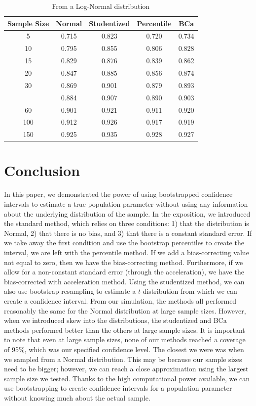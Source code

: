 \documentclass[12pt]{article}
\begin{document}
\begin{table}

\caption{\label{tab:create graphs}From a Log-Normal distribution}
\centering
\begin{tabular}[t]{ccccc}
\toprule
Sample Size & Normal & Studentized & Percentile & BCa\\
\midrule
5 & 0.715 & 0.823 & 0.720 & 0.734\\
10 & 0.795 & 0.855 & 0.806 & 0.828\\
15 & 0.829 & 0.876 & 0.839 & 0.862\\
20 & 0.847 & 0.885 & 0.856 & 0.874\\
30 & 0.869 & 0.901 & 0.879 & 0.893\\
\addlinespace
40 & 0.884 & 0.907 & 0.890 & 0.903\\
60 & 0.901 & 0.921 & 0.911 & 0.920\\
100 & 0.912 & 0.926 & 0.917 & 0.919\\
150 & 0.925 & 0.935 & 0.928 & 0.927\\
\bottomrule
\end{tabular}
\end{table}
\newpage

\hypertarget{conclusion}{%
\section{Conclusion}\label{conclusion}}

In this paper, we demonstrated the power of using bootstrapped
confidence intervals to estimate a true population parameter without
using any information about the underlying distribution of the sample.
In the exposition, we introduced the standard method, which relies on
three conditions: 1) that the distribution is Normal, 2) that there is
no bias, and 3) that there is a constant standard error. If we take away
the first condition and use the bootstrap percentiles to create the
interval, we are left with the percentile method. If we add a
bias-correcting value not equal to zero, then we have the
bias-correcting method. Furthermore, if we allow for a non-constant
standard error (through the acceleration), we have the bias-corrected
with acceleration method. Using the studentized method, we can also use
bootstrap resampling to estimate a \(t\)-distribution from which we can
create a confidence interval. From our simulation, the methods all
performed reasonably the same for the Normal distribution at large
sample sizes. However, when we introduced skew into the distributions,
the studentized and BCa methods performed better than the others at
large sample sizes. It is important to note that even at large sample
sizes, none of our methods reached a coverage of 95\%, which was our
specified confidence level. The closest we were was when we sampled from
a Normal distribution. This may be because our sample sizes need to be
bigger; however, we can reach a close approximation using the largest
sample size we tested. Thanks to the high computational power available,
we can use bootstrapping to create confidence intervals for a population
parameter without knowing much about the actual sample.



\end{document}
